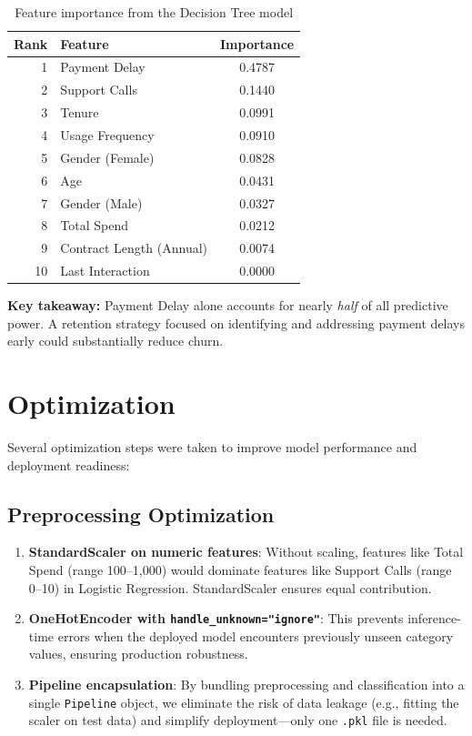 \documentclass[12pt, a4paper]{article}
\begin{document}
\begin{table}[H]
\centering
\caption{Feature importance from the Decision Tree model}
\label{tab:importance}
\renewcommand{\arraystretch}{1.2}
\begin{tabular}{@{} r l c @{}}
\toprule
\textbf{Rank} & \textbf{Feature} & \textbf{Importance} \\
\midrule
1 & Payment Delay        & 0.4787 \\
2 & Support Calls        & 0.1440 \\
3 & Tenure               & 0.0991 \\
4 & Usage Frequency      & 0.0910 \\
5 & Gender (Female)      & 0.0828 \\
6 & Age                  & 0.0431 \\
7 & Gender (Male)        & 0.0327 \\
8 & Total Spend          & 0.0212 \\
9 & Contract Length (Annual) & 0.0074 \\
10 & Last Interaction    & 0.0000 \\
\bottomrule
\end{tabular}
\end{table}

\textbf{Key takeaway:} Payment Delay alone accounts for nearly \textit{half} of all predictive power. A retention strategy focused on identifying and addressing payment delays early could substantially reduce churn.

\section{Optimization}

Several optimization steps were taken to improve model performance and deployment readiness:

\subsection{Preprocessing Optimization}

\begin{enumerate}
    \item \textbf{StandardScaler on numeric features}: Without scaling, features like Total Spend (range 100--1,000) would dominate features like Support Calls (range 0--10) in Logistic Regression. StandardScaler ensures equal contribution.
    \item \textbf{OneHotEncoder with \texttt{handle\_unknown="ignore"}}: This prevents inference-time errors when the deployed model encounters previously unseen category values, ensuring production robustness.
    \item \textbf{Pipeline encapsulation}: By bundling preprocessing and classification into a single \texttt{Pipeline} object, we eliminate the risk of data leakage (e.g., fitting the scaler on test data) and simplify deployment---only one \texttt{.pkl} file is needed.
\end{enumerate}
\end{document}
